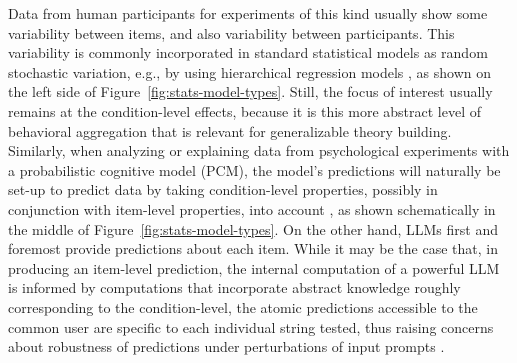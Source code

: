 \documentclass[fleqn]{article}
\begin{document}
Data from human participants for experiments of this kind usually show some variability between items, and also variability between participants.
This variability is commonly incorporated in standard statistical models as random stochastic variation, e.g., by using hierarchical regression models \citep{Jaeger2008:Categorical-dat,barr2013,SorensenHohensteinb2016:Bayesian-linear}, as shown on the left side of Figure~\ref{fig:stats-model-types}.
Still, the focus of interest usually remains at the condition-level effects, because it is this more abstract level of behavioral aggregation that is relevant for generalizable theory building.
Similarly, when analyzing or explaining data from psychological experiments with a probabilistic cognitive model (PCM), the model's predictions will naturally be set-up to predict data by taking condition-level properties, possibly in conjunction with item-level properties, into account \citep[e.g.,][]{NilsonRieskamp2011:Hierarchical-Ba,Lee2011:How-Cognitive-M,ScheibehenneRieskamp2013:Testing-the-Ada}, as shown schematically in the middle of Figure~\ref{fig:stats-model-types}.
On the other hand, LLMs first and foremost provide predictions about each item.
While it may be the case that, in producing an item-level prediction, the internal computation of a powerful LLM is informed by computations that incorporate abstract knowledge roughly corresponding to the condition-level, the atomic predictions accessible to the common user are specific to each individual string tested, thus raising concerns about robustness of predictions under perturbations of input prompts .
\end{document}
